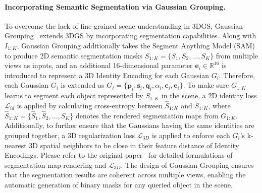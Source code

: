 \paragraph{Incorporating Semantic Segmentation via Gaussian Grouping.}
To overcome the lack of fine-grained scene understanding in 3DGS, Gaussian Grouping~\cite{ye2023gaussiangrouping} extends 3DGS by incorporating segmentation capabilities. Along with $I_{1:K}$, Gaussian Grouping additionally takes the Segment Anything Model (SAM) to produce 2D semantic segmentation masks $S_{1:K} = \{S_1, S_2, ..., S_K\}$ from multiple views as inputs, and an additional 16-dimensional parameter $\mathbf{e}_i \in \mathbb{R}^{16}$ is introduced to represent a 3D Identity Encoding for each Gaussian $G_i$. Therefore, each Gaussian $G_i$ is extended as $G_i = \{\mathbf{p}_i, \mathbf{s}_i, \mathbf{q}_i, {\alpha}_i, \mathbf{c}_i, \mathbf{e}_i\}$. To make sure $G_{1:K}$ learns to segment each object represented by $S_{1:K}$ in the scene, a 2D identity loss $\mathcal{L}_{id}$ is applied by calculating cross-entropy between $\hat{S}_{1:K}$ and $S_{1:K}$, where $\hat{S}_{1:K} = \{\hat{S}_1, \hat{S}_2, ... , S_K\}$ denotes the rendered segmentation maps from $G_{1:K}$. Additionally, to further ensure that the Gaussians having the same identities are grouped together, a 3D regularization loss $\mathcal{L}_{3D}$ is applied to enforce each $G_i$'s k-nearest 3D spatial neighbors to be close in their feature distance of Identity Encodings. Please refer to the original paper~\cite{ye2023gaussiangrouping} for detailed formulations of segmentation map rendering and $\mathcal{L}_{3D}$. The design of Gaussian Grouping ensures that the segmentation results are coherent across multiple views, enabling the automatic generation of binary masks for any queried object in the scene.

